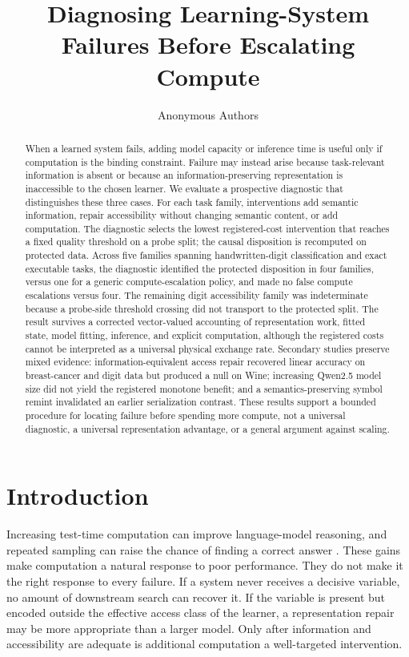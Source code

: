 \documentclass[10pt]{article}
\title{Diagnosing Learning-System Failures Before Escalating Compute}
\author{Anonymous Authors}
\begin{document}
\maketitle

\begin{abstract}
When a learned system fails, adding model capacity or inference time is useful only if computation is the binding constraint. Failure may instead arise because task-relevant information is absent or because an information-preserving representation is inaccessible to the chosen learner. We evaluate a prospective diagnostic that distinguishes these three cases. For each task family, interventions add semantic information, repair accessibility without changing semantic content, or add computation. The diagnostic selects the lowest registered-cost intervention that reaches a fixed quality threshold on a probe split; the causal disposition is recomputed on protected data. Across five families spanning handwritten-digit classification and exact executable tasks, the diagnostic identified the protected disposition in four families, versus one for a generic compute-escalation policy, and made no false compute escalations versus four. The remaining digit accessibility family was indeterminate because a probe-side threshold crossing did not transport to the protected split. The result survives a corrected vector-valued accounting of representation work, fitted state, model fitting, inference, and explicit computation, although the registered costs cannot be interpreted as a universal physical exchange rate. Secondary studies preserve mixed evidence: information-equivalent access repair recovered linear accuracy on breast-cancer and digit data but produced a null on Wine; increasing Qwen2.5 model size did not yield the registered monotone benefit; and a semantics-preserving symbol remint invalidated an earlier serialization contrast. These results support a bounded procedure for locating failure before spending more compute, not a universal diagnostic, a universal representation advantage, or a general argument against scaling.
\end{abstract}

\section{Introduction}

Increasing test-time computation can improve language-model reasoning, and repeated sampling can raise the chance of finding a correct answer \citep{snell2024testtime,brown2024monkeys}. These gains make computation a natural response to poor performance. They do not make it the right response to every failure. If a system never receives a decisive variable, no amount of downstream search can recover it. If the variable is present but encoded outside the effective access class of the learner, a representation repair may be more appropriate than a larger model. Only after information and accessibility are adequate is additional computation a well-targeted intervention.
\end{document}

